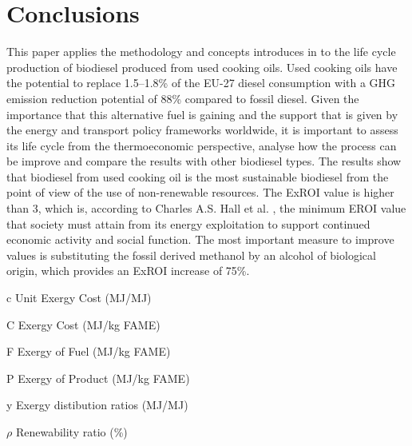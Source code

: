 \documentclass[sustainability,article,submit,moreauthors,pdftex,12pt,a4paper]{mdpi}
\begin{document}

\section{Conclusions}

This paper applies the methodology and concepts introduces in \cite{FontdeMora2012,FontdeMora2013,Torres2012b} to the life cycle production of biodiesel produced from used cooking oils. Used cooking oils have the potential to replace 1.5--1.8\% of the EU-27 diesel consumption with a GHG emission reduction potential of 88\% compared to fossil diesel. Given the importance that this alternative fuel is gaining and the support that is given by the energy and transport policy frameworks worldwide, it is important to assess its life cycle from the thermoeconomic perspective, analyse how the process can be improve and compare the results with other biodiesel types. The results show that biodiesel from used cooking oil is the most sustainable biodiesel from the point of view of the use of non-renewable resources. The ExROI value is higher than 3, which is, according to Charles A.S. Hall et al. \cite{Hall2009}, the minimum EROI value that society must attain from its energy exploitation to support continued economic activity and social function. The most important measure to improve values is substituting the fossil derived methanol by an alcohol of biological origin, which provides an ExROI increase of 75\%.

\makeatletter
\renewcommand\@biblabel[1]{#1.}
\makeatother



\begin{list}{}{
    \renewcommand*{\makelabel}[1]{\hspace{\labelsep}\raggedleft #1}  
    \setlength{\labelwidth}{3em}
    \setlength{\leftmargin}{\labelwidth}
    \setlength{\parsep}{0pt}
    \setlength{\itemsep}{0pt}
    \sloppy}
    \item[c] Unit Exergy Cost (MJ/MJ)
    \item[C] Exergy Cost (MJ/kg FAME) 
    \item[F] Exergy of Fuel (MJ/kg FAME)
    \item[P] Exergy of Product (MJ/kg FAME)
    \item[y] Exergy distibution ratios (MJ/MJ)
    \item[$\rho$] Renewability ratio (\%)
\end{list}
\end{document}

